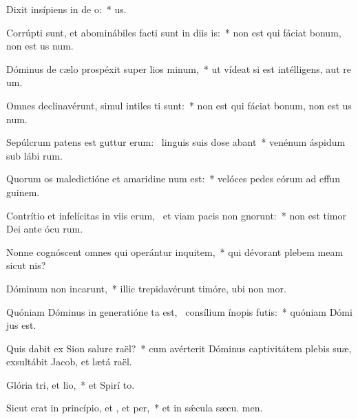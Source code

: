 \item Dixit insípiens in de o:~*   us.
\item Corrúpti sunt, et abominábiles facti sunt in diis is:~* non est qui fáciat bonum, non est us  num.
\item Dóminus de cælo prospéxit super lios minum,~* ut vídeat si est intélligens, aut re um.
\item Omnes declinavérunt, simul intiles ti sunt:~* non est qui fáciat bonum, non est us  num.
\item Sepúlcrum patens est guttur erum:~\pscross{} linguis suis dose abant~* venénum áspidum sub lábi rum.
\item Quorum os maledictióne et amaridine num est:~* velóces pedes eórum ad effun guinem.
\item Contrítio et infelícitas in viis erum,~\pscross{} et viam pacis non gnorunt:~* non est timor Dei ante ócu rum.
\item Nonne cognóscent omnes qui operántur inquitem,~* qui dévorant plebem meam sicut  nis?
\item Dóminum non incarunt,~* illic trepidavérunt timóre, ubi non  mor.
\item Quóniam Dóminus in generatióne ta est,~\pscross{} consílium ínopis futis:~* quóniam Dómi  jus est.
\item Quis dabit ex Sion salure raël?~* cum avérterit Dóminus captivitátem plebis suæ, exsultábit Jacob, et lætá raël.
\item Glória tri, et lio,~* et Spirí to.
\item Sicut erat in princípio, et , et per,~* et in sǽcula sæcu. men.

